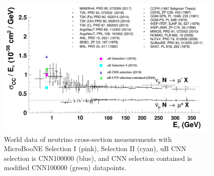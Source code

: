 \begin{figure}[htp!]
\centering
\includegraphics[angle=90,width=.8\textwidth]{figs/c_data_PDB_02_contained.png}
\caption{World data of neutrino cross-section measurements with MicroBooNE Selection I (pink), Selection II (cyan), uB CNN selection is CNN100000 (blue), and CNN selection contained is modified CNN100000 (green) datapoints.}
\label{fig:xsec}
\end{figure}
